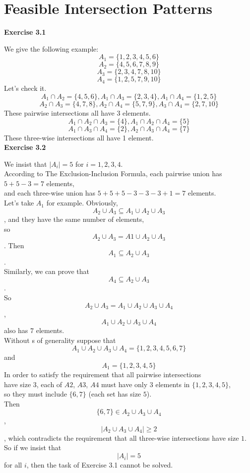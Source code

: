 \documentclass{article} %
\begin{document}
	
	
	
	\section{Feasible Intersection Patterns}
	\textbf{Exercise 3.1}\par
	We give the following example:
	$$A_1=\{1,2,3,4,5,6\}$$
	$$A_2=\{4,5,6,7,8,9\}$$
	$$A_3=\{2,3,4,7,8,10\}$$
	$$A_4=\{1,2,5,7,9,10\}$$
	Let's check it.
	$$A_1 \cap A_2=\{4,5,6\}	, A_1 \cap A_3=\{2,3,4\} ,	A_1 \cap A_4=\{1,2,5\}$$
	$$A_2 \cap A_3=\{4,7,8\}	, A_2 \cap A_4=\{5,7,9\} ,	A_3 \cap A_4=\{2,7,10\}$$
	These pairwise intersections all have 3 elements.
	$$A_1 \cap A_2 \cap A_3=\{4\}	, A_1 \cap A_2 \cap A_4=\{5\}$$
	$$A_1 \cap A_3 \cap A_4=\{2\}	, A_2 \cap A_3 \cap A_4=\{7\}$$
	These three-wise intersections all have 1 element.\\
	
	
	\textbf{Exercise 3.2}\par
	We insist that $\mid A_i \mid =5$ for $i=1 ,2,3,4$.\\
	According to The Exclusion-Inclusion Formula, each pairwise union has $5+5-3=7$ elements, \\
	and each three-wise union has $5+5+5-3-3-3+1=7$ elements.\\
	Let's take $A_1$ for example. Obviously, $$A_2 \cup A_3 \subseteq A_1 \cup A_2 \cup A_3$$, and they have the same number of elements,\\
	so $$A_2 \cup A_3 = A1 \cup A_2 \cup A_3$$. Then $$A_1 \subseteq A_2 \cup A_3$$.\\
	Similarly, we can prove that $$A_4 \subseteq A_2 \cup A_3$$.\\
	So $$A_2 \cup A_3=A_1 \cup A_2 \cup A_3 \cup A_4$$, $$A_1 \cup A_2 \cup A_3 \cup A_4$$ also has $7$ elements.\\
	Without s of generality suppose that\\
	$$A_1 \cup A_2 \cup A_3 \cup A_4=\{1,2,3,4,5,6,7\}$$ and $$A_1=\{1,2,3,4,5\}$$
	In order to satisfy the requirement that all pairwise intersections\\
	have size $3$, each of $A2$, $A3$, $A4$ must have only $3$ elements in $\{1,2,3,4,5\}$, \\so they must include $\{6,7\}$ (each set has size $5$).\\
	Then $$\{6,7\} \in A_2 \cup A_3 \cup A_4$$, $$ \mid A_2 \cup A_3 \cup A_4 \mid \ge 2$$, which contradicts the requirement that all three-wise intersections have size $1$.\\
	So if we insist that $$ \mid A_i\mid  = 5$$ for all $i$, then the task of Exercise 3.1 cannot be solved.\\
	
\end{document}
